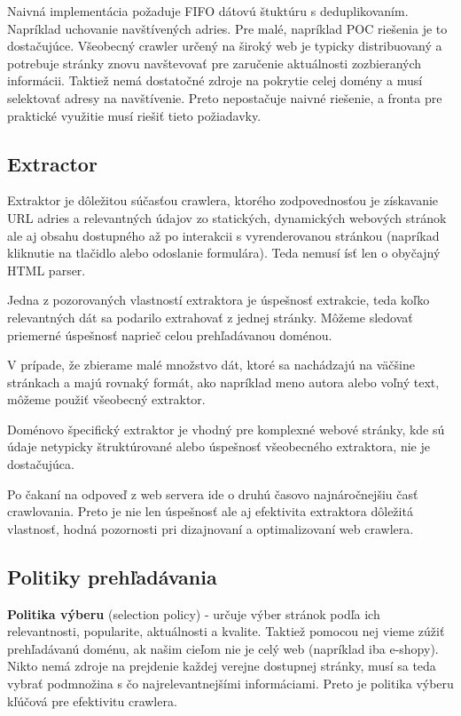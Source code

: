 Naivná implementácia požaduje FIFO dátovú štuktúru s deduplikovaním. Napríklad uchovanie navštívených adries. Pre malé, napríklad POC riešenia je to dostačujúce. 
Všeobecný crawler určený na široký web je typicky distribuovaný a potrebuje stránky znovu navštevovať pre zaručenie aktuálnosti zozbieraných informácii. Taktiež nemá dostatočné zdroje na pokrytie celej domény a musí selektovať adresy na navštívenie. Preto nepostačuje naivné riešenie, a fronta pre praktické využitie musí riešiť tieto požiadavky. 

\subsection{Extractor}
Extraktor je dôležitou súčasťou crawlera, ktorého zodpovednosťou je získavanie URL adries a relevantných údajov zo statických, dynamických webových stránok ale aj obsahu dostupného až po interakcii s vyrenderovanou stránkou (napríkad kliknutie na tlačidlo alebo odoslanie formulára). Teda nemusí ísť len o obyčajný HTML parser. 

Jedna z pozorovaných vlastností extraktora je úspešnosť extrakcie, teda koľko relevantných dát sa podarilo extrahovať z jednej stránky. Môžeme sledovať priemerné úspešnosť naprieč celou prehľadávanou doménou.  

V prípade, že zbierame malé množstvo dát, ktoré sa nachádzajú na väčšine stránkach a majú rovnaký formát, ako napríklad meno autora alebo voľný text, môžeme použiť všeobecný extraktor.  

Doménovo špecifický extraktor je vhodný pre komplexné webové stránky, kde sú údaje netypicky štruktúrované alebo úspešnosť všeobecného extraktora, nie je dostačujúca. 

Po čakaní na odpoveď z web servera ide o druhú časovo najnáročnejšiu časť crawlovania. Preto je nie len úspešnosť ale aj efektivita extraktora dôležitá vlastnosť, hodná pozornosti pri dizajnovaní a optimalizovaní web crawlera.

\subsection{Politiky prehľadávania}
\textbf{Politika výberu} (selection policy) - určuje výber stránok podľa ich relevantnosti, popularite, aktuálnosti a kvalite. Taktiež pomocou nej vieme zúžiť prehľadávanú doménu, ak našim cieľom nie je celý web (napríklad iba e-shopy). Nikto nemá zdroje na prejdenie každej verejne dostupnej stránky, musí sa teda vybrať podmnožina s čo najrelevantnejšími informáciami. Preto je politika výberu kľúčová pre efektivitu crawlera. 

